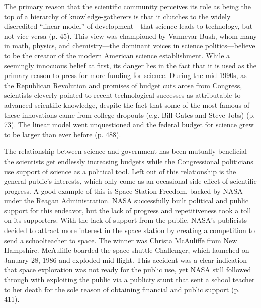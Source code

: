 \documentclass{article}[12pt]
\begin{document}
The primary reason that the scientific community perceives its role as being
the top of a hierarchy of knowledge-gatherers is that it clutches to the widely
discredited ``linear model'' of development---that science leads to technology,
but not vice-versa (p. 45). This view was championed by Vannevar Bush, whom
many in math, physics, and chemistry---the dominant voices in science
politics---believe to be the creator of the modern American science
establishment. While a seemingly innocuous belief at first, its danger lies in
the fact that it is used as the primary reason to press for more funding for
science. During the mid-1990s, as the Republican Revolution and promises of
budget cuts arose from Congress, scientists cleverly pointed to recent
technological successes as attributable to advanced scientific knowledge,
despite the fact that some of the most famous of these innovations came from
college dropouts (e.g. Bill Gates and Steve Jobs) (p. 73). The linear model
went unquestioned and the federal budget for science grew to be larger than
ever before (p. 488).

The relationship between science and government has been mutually
beneficial---the scientists get endlessly increasing budgets while the
Congressional politicians use support of science as a political tool. Left out
of this relationship is the general public's interests, which only come as an
occasional side effect of scientific progress. A good example of this is Space
Station Freedom, backed by NASA under the Reagan Administration.  NASA
successfully built political and public support for this endeavor, but the lack
of progress and repetitiveness took a toll on its supporters.  With the lack of
support from the public, NASA's publicists decided to attract more interest in
the space station by creating a competition to send a schoolteacher to space.
The winner was Christa McAuliffe from New Hampshire.  McAuliffe boarded the
space shuttle Challenger, which launched on January 28, 1986 and exploded
mid-flight.  This accident was a clear indication that space exploration was
not ready for the public use, yet NASA still followed through with exploiting
the public via a publicty stunt that sent a school teacher to her death for the
sole reason of obtaining financial and public support (p. 411).
\end{document}
